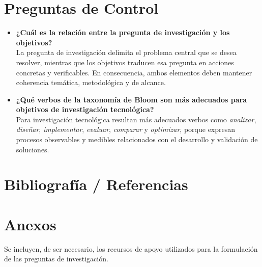 \documentclass[11pt,a4paper]{article}
\begin{document}
\section{Preguntas de Control}

\begin{itemize}[leftmargin=1.2cm,itemsep=0.35em]
  \item \textbf{¿Cuál es la relación entre la pregunta de investigación y los objetivos?}\\
  La pregunta de investigación delimita el problema central que se desea resolver, mientras que los objetivos traducen esa pregunta en acciones concretas y verificables. En consecuencia, ambos elementos deben mantener coherencia temática, metodológica y de alcance.

  \item \textbf{¿Qué verbos de la taxonomía de Bloom son más adecuados para objetivos de investigación tecnológica?}\\
  Para investigación tecnológica resultan más adecuados verbos como \textit{analizar}, \textit{diseñar}, \textit{implementar}, \textit{evaluar}, \textit{comparar} y \textit{optimizar}, porque expresan procesos observables y medibles relacionados con el desarrollo y validación de soluciones.
\end{itemize}

\nocite{*}
\section{Bibliografía / Referencias}



\section{Anexos}

Se incluyen, de ser necesario, los recursos de apoyo utilizados para la formulación de las preguntas de investigación.
\end{document}
